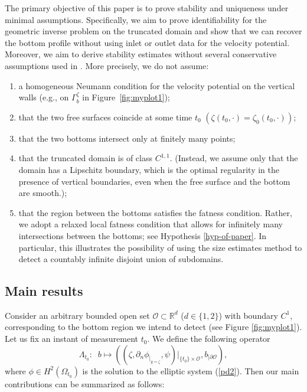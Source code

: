 \documentclass[11pt]{article}
\begin{document}
The primary objective of this paper is to prove stability and uniqueness under minimal assumptions. Specifically, we aim to prove identifiability for the geometric inverse problem on the truncated domain and show that we can recover the bottom profile without using inlet or outlet data for the velocity potential. Moreover, we aim to derive stability estimates without several conservative assumptions used in \cite{lecaros2020stability}. More precisely, we do not assume:
\begin{enumerate}[label=(\roman*)]
  \item a homogeneous Neumann condition for the velocity potential on the vertical walls (e.g., on $\Gamma_b^{\zeta}$ in Figure~\ref{fig:myplot1});
  \item  that the two free surfaces coincide at some time $t_0$ $(\zeta(t_0,\cdot)=\zeta_0(t_0,\cdot))$;
  \item that the two bottoms intersect only at finitely many points;
  \item that the truncated domain is of class $C^{1,1}$. (Instead, we assume only that the domain has a Lipschitz boundary, which is the optimal regularity in the presence of vertical boundaries, even when the free surface and the bottom are smooth.);
  \item that the region between the bottoms satisfies the fatness condition. Rather, we adopt a relaxed local fatness condition that allows for infinitely many intersections between the bottoms; see Hypothesis \ref{hyp-of-paper}. In particular, this illustrates the possibility of using the size estimates method to detect a countably infinite disjoint union of subdomains.
\end{enumerate}
  


\subsection{Main results}
Consider an arbitrary bounded open set $\mathcal O \subset \mathbb R^d$ ($d\in\{1,2\}$) with boundary $C^1$, corresponding to the bottom region we intend to detect
(see Figure \ref{fig:myplot1}). Let us fix an instant of measurement $t_0$. We define the following operator
\begin{equation}\label{operatorofbottom}
	\Lambda_{t_0}:\;\; b \longmapsto\left( \left(\zeta, \partial_n\phi_{|_{y=\zeta}}, \psi\right)|_{\{t_0\}\times \mathcal O} ,b_{\vert \partial \mathcal O}\right),
\end{equation}
where $\phi\in H^2(\Omega_{t_0})$  is the solution to the elliptic system (\ref{pd2}). Then our main contributions can be summarized as follows:
\end{document}
